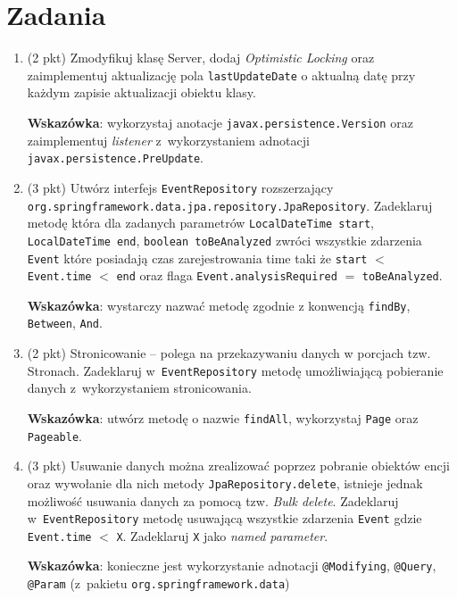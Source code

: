 \documentclass[12pt]{article}
\begin{document}
    \section*{Zadania}
    \begin{enumerate}
        \item
            (2 pkt) Zmodyfikuj klasę Server, dodaj \emph{Optimistic Locking} oraz zaimplementuj aktualizację pola \texttt{lastUpdateDate} o aktualną datę przy każdym zapisie aktualizacji obiektu klasy.

            \textbf{Wskazówka}: wykorzystaj anotacje \texttt{javax.persistence.Version} oraz zaimplementuj \emph{listener} z~wykorzystaniem  adnotacji \texttt{javax.persistence.PreUpdate}.

        \item
            (3 pkt) Utwórz interfejs \texttt{EventRepository} rozszerzający \texttt{org\allowbreak .spring\-frame\-work\allowbreak .data\allowbreak .jpa\allowbreak .re\-po\-si\-to\-ry.Jpa\-Repo\-si\-tory}. Zadeklaruj metodę która dla zadanych parametrów \texttt{Local\-Date\-Time start}, \texttt{Local\-Date\-Time end}, \texttt{boolean toBeAnalyzed} zwróci wszystkie zdarzenia \texttt{Event} które posiadają czas zarejestrowania time taki że \texttt{start} $<$ \texttt{Event.time} $<$ \texttt{end} oraz flaga \texttt{Event.analysisRequired} $=$ \texttt{toBeAnalyzed}.

            \textbf{Wskazówka}: wystarczy nazwać metodę zgodnie z konwencją \texttt{findBy}, \texttt{Between}, \texttt{And}.

        \item
            (2 pkt) Stronicowanie – polega na przekazywaniu danych w porcjach tzw. Stronach. Zadeklaruj w~\texttt{EventRepository} metodę umożliwiającą pobieranie danych z~wykorzystaniem stronicowania.

            \textbf{Wskazówka}: utwórz metodę o nazwie \texttt{findAll}, wykorzystaj \texttt{Page} oraz \texttt{Pageable}.

        \item
            (3 pkt) Usuwanie danych można zrealizować poprzez pobranie obiektów encji oraz wywołanie dla nich metody \texttt{JpaRepository.delete}, istnieje jednak możliwość usuwania danych za pomocą tzw. \emph{Bulk delete}. Zadeklaruj w~\texttt{EventRepository} metodę usuwającą wszystkie zdarzenia \texttt{Event} gdzie \texttt{Event.time} $<$ \texttt{X}. Zadeklaruj \texttt{X} jako \emph{named parameter}.

            \textbf{Wskazówka}: konieczne jest wykorzystanie adnotacji \texttt{@Modifying}, \texttt{@Query}, \texttt{@Param} (z~pakietu \texttt{org\allowbreak .spring\-frame\-work\allowbreak .data})


\end{enumerate}
\end{document}
